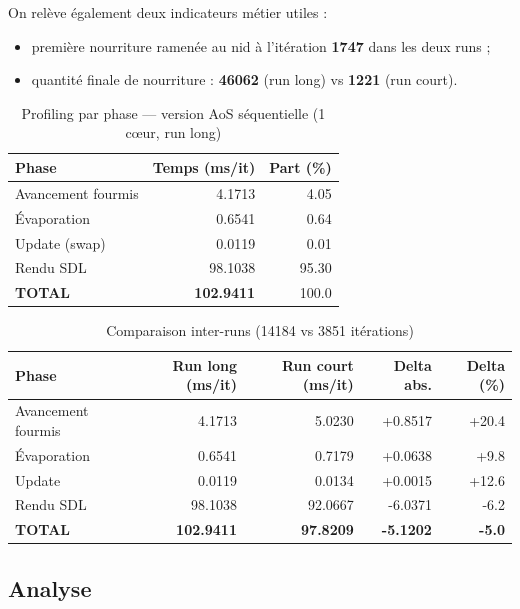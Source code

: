 On relève également deux indicateurs métier utiles :
\begin{itemize}
    \item première nourriture ramenée au nid à l'itération \textbf{1747} dans les deux runs ;
    \item quantité finale de nourriture : \textbf{46062} (run long) vs \textbf{1221} (run court).
\end{itemize}

\begin{table}[h]
\centering
\caption{Profiling par phase — version AoS séquentielle (1 cœur, run long)}
\label{tab:aos_timing}
\begin{tabular}{lrr}
\hline
\textbf{Phase}      & \textbf{Temps (ms/it)} & \textbf{Part (\%)} \\
\hline
Avancement fourmis  & 4.1713   & 4.05  \\
Évaporation         & 0.6541   & 0.64  \\
Update (swap)       & 0.0119   & 0.01  \\
Rendu SDL           & 98.1038  & 95.30 \\
\hline
\textbf{TOTAL}      & \textbf{102.9411} & 100.0 \\
\hline
\end{tabular}
\end{table}

\begin{table}[h]
\centering
\caption{Comparaison inter-runs (14184 vs 3851 itérations)}
\label{tab:aos_timing_compare}
\begin{tabular}{lrrrr}
\hline
\textbf{Phase} & \textbf{Run long (ms/it)} & \textbf{Run court (ms/it)} & \textbf{Delta abs.} & \textbf{Delta (\%)} \\
\hline
Avancement fourmis & 4.1713 & 5.0230 & +0.8517 & +20.4 \\
Évaporation        & 0.6541 & 0.7179 & +0.0638 & +9.8  \\
Update             & 0.0119 & 0.0134 & +0.0015 & +12.6 \\
Rendu SDL          & 98.1038 & 92.0667 & -6.0371 & -6.2 \\
\hline
\textbf{TOTAL}     & \textbf{102.9411} & \textbf{97.8209} & \textbf{-5.1202} & \textbf{-5.0} \\
\hline
\end{tabular}
\end{table}

\subsection{Analyse}

